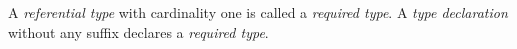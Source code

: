 A \emph{referential type} with cardinality one is called a \emph{required type}.
A \emph{type declaration} without any suffix declares a \emph{required type}.
